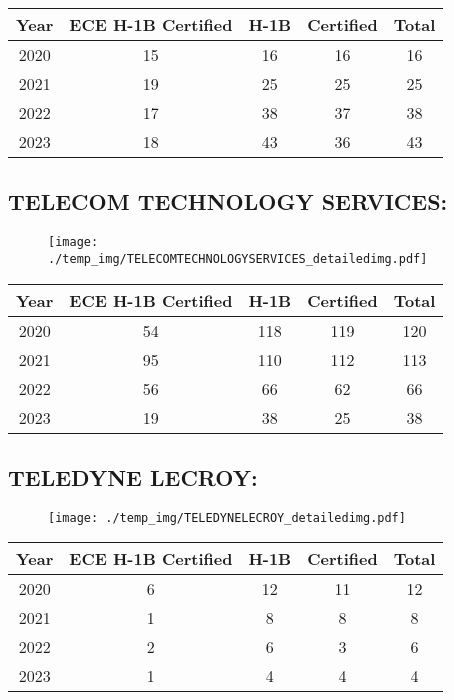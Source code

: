 \documentclass{article}%
\begin{document}
%
\begin{longtable}{c|c|c|c|c}%
\hline%
Year&ECE H{-}1B Certified&H{-}1B&Certified&Total\\%
\hline%
2020&15&16&16&16\\%
\hline%
2021&19&25&25&25\\%
\hline%
2022&17&38&37&38\\%
\hline%
2023&18&43&36&43\\%
\hline%
\end{longtable}

%
\newpage%
\subsection{TELECOM TECHNOLOGY SERVICES:}%
\label{subsec:TELECOMTECHNOLOGYSERVICES}%
\label{TELECOMTECHNOLOGYSERVICESdetailed}%


\begin{figure}[htbp]%
\centering%
\texttt{[image: ./temp\_img/TELECOMTECHNOLOGYSERVICES\_detailedimg.pdf]}%
\end{figure}

%
\begin{longtable}{c|c|c|c|c}%
\hline%
Year&ECE H{-}1B Certified&H{-}1B&Certified&Total\\%
\hline%
2020&54&118&119&120\\%
\hline%
2021&95&110&112&113\\%
\hline%
2022&56&66&62&66\\%
\hline%
2023&19&38&25&38\\%
\hline%
\end{longtable}

%
\newpage%
\subsection{TELEDYNE LECROY:}%
\label{subsec:TELEDYNELECROY}%
\label{TELEDYNELECROYdetailed}%


\begin{figure}[htbp]%
\centering%
\texttt{[image: ./temp\_img/TELEDYNELECROY\_detailedimg.pdf]}%
\end{figure}

%
\begin{longtable}{c|c|c|c|c}%
\hline%
Year&ECE H{-}1B Certified&H{-}1B&Certified&Total\\%
\hline%
2020&6&12&11&12\\%
\hline%
2021&1&8&8&8\\%
\hline%
2022&2&6&3&6\\%
\hline%
2023&1&4&4&4\\%
\hline%
\end{longtable}
\end{document}
